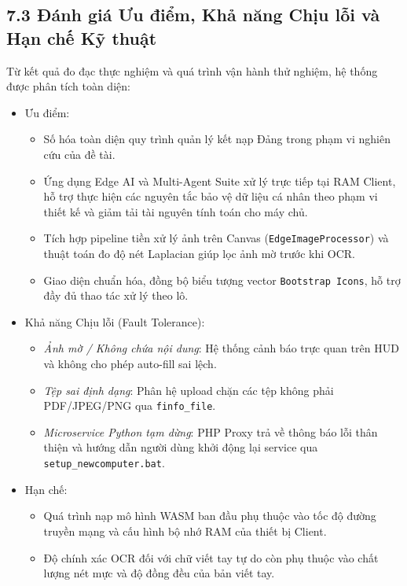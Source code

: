 \documentclass[12pt,a4paper]{report}
\begin{document}
\subsection*{7.3 Đánh giá Ưu điểm, Khả năng Chịu lỗi và Hạn chế Kỹ thuật}
Từ kết quả đo đạc thực nghiệm và quá trình vận hành thử nghiệm, hệ thống được phân tích toàn diện:
\begin{itemize}[label=--,leftmargin=*]
  \item Ưu điểm:
        \begin{itemize}[label=--,leftmargin=*]
          \item Số hóa toàn diện quy trình quản lý kết nạp Đảng trong phạm vi nghiên cứu của đề tài.
          \item Ứng dụng Edge AI và Multi-Agent Suite xử lý trực tiếp tại RAM Client, hỗ trợ thực hiện các nguyên tắc bảo vệ dữ liệu cá nhân theo phạm vi thiết kế và giảm tải tài nguyên tính toán cho máy chủ.
          \item Tích hợp pipeline tiền xử lý ảnh trên Canvas (\texttt{EdgeImageProcessor}) và thuật toán đo độ nét Laplacian giúp lọc ảnh mờ trước khi OCR.
          \item Giao diện chuẩn hóa, đồng bộ biểu tượng vector \texttt{Bootstrap Icons}, hỗ trợ đầy đủ thao tác xử lý theo lô.
        \end{itemize}
  \item Khả năng Chịu lỗi (Fault Tolerance):
        \begin{itemize}[label=--,leftmargin=*]
          \item \textit{Ảnh mờ / Không chứa nội dung}: Hệ thống cảnh báo trực quan trên HUD và không cho phép auto-fill sai lệch.
          \item \textit{Tệp sai định dạng}: Phân hệ upload chặn các tệp không phải PDF/JPEG/PNG qua \texttt{finfo\_file}.
          \item \textit{Microservice Python tạm dừng}: PHP Proxy trả về thông báo lỗi thân thiện và hướng dẫn người dùng khởi động lại service qua \texttt{setup\_newcomputer.bat}.
        \end{itemize}
  \item Hạn chế:
        \begin{itemize}[label=--,leftmargin=*]
          \item Quá trình nạp mô hình WASM ban đầu phụ thuộc vào tốc độ đường truyền mạng và cấu hình bộ nhớ RAM của thiết bị Client.
          \item Độ chính xác OCR đối với chữ viết tay tự do còn phụ thuộc vào chất lượng nét mực và độ đồng đều của bản viết tay.
        \end{itemize}
\end{itemize}
\end{document}
